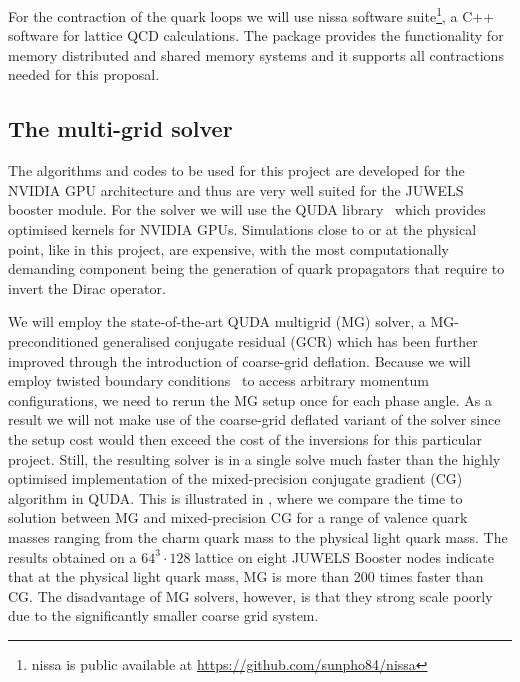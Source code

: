 For the contraction of the quark loops we will use nissa software
suite\footnote{nissa is public available at
\url{https://github.com/sunpho84/nissa}}, a C++  software for lattice
QCD calculations. The package provides the functionality for memory
distributed and shared memory systems and it supports all contractions 
needed for this proposal.

\subsection{The multi-grid solver}
The algorithms and codes to be used for this project are developed  for the NVIDIA GPU architecture
and thus are very well suited for the JUWELS booster module. For the solver we will use the QUDA library~\cite{Clark:2009wm,Babich:2011np,Clark:2016rdz} which provides optimised kernels for NVIDIA GPUs.
Simulations close to or at the physical point, like in this project, are  expensive, with the most computationally demanding component being the generation of quark propagators that require to invert the Dirac operator.

We will employ the state-of-the-art QUDA multigrid (MG) solver, a MG-preconditioned generalised conjugate residual (GCR) which has been further improved through the introduction of coarse-grid deflation.
Because we will employ twisted boundary conditions~\cite{deDivitiis:2004kq} to access arbitrary momentum configurations, we need to rerun the MG setup once for each phase angle.
As a result we will not make use of the coarse-grid deflated variant of the solver since the setup cost would then exceed the cost of the inversions for this particular project.
Still, the resulting solver is in a single solve much faster than the highly optimised implementation of the mixed-precision conjugate gradient (CG) algorithm in QUDA.
This is illustrated in , where we compare the time to solution between MG and mixed-precision CG for a range of valence quark masses ranging from the charm quark mass to the physical light quark mass.
The results obtained on a $64^3 \cdot 128$ lattice on eight JUWELS Booster nodes indicate that at the physical light quark mass, MG is more than 200 times faster than CG.
The disadvantage of MG solvers, however, is that they strong scale poorly due to the significantly smaller coarse grid system.

